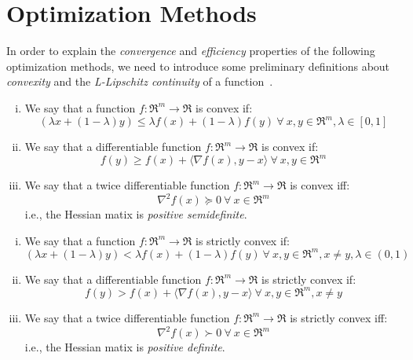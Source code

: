 
\section{Optimization Methods}

In order to explain the \emph{convergence} and \emph{efficiency} properties of the following optimization methods, we need to introduce some preliminary definitions about \emph{convexity} and the \emph{L-Lipschitz continuity} of a function~\cite{boyd2004convex}.

\begin{definition}[Convexity] \label{def:convexity}
	\hfill
	\begin{enumerate}[(i)]
		\item We say that a function $f: \Re^m \rightarrow \Re$ is convex if: 
		$$ 
			(\lambda x + (1 - \lambda) y ) \leq \lambda f(x) + (1 - \lambda) f(y) \ \forall \ x, y \in \Re^m, \lambda \in [0,1] 
		$$
		\item We say that a differentiable function $f: \Re^m \rightarrow \Re$ is convex if: 
		$$ 
			f(y) \geq f(x) + \langle \nabla f(x), y - x \rangle \ \forall \ x, y \in \Re^m 
		$$
		\item We say that a twice differentiable function $f: \Re^m \rightarrow \Re$ is convex iff: 
		$$ 
			\nabla^2 f(x) \succeq 0 \ \forall \ x \in \Re^m 
		$$ i.e., the Hessian matix is \emph{positive semidefinite}.
	\end{enumerate}
\end{definition}

\begin{definition} \label{def:strict_convexity}
	\hfill
	\begin{enumerate}[(i)]
		\item We say that a function $f: \Re^m \rightarrow \Re$ is strictly convex if: 
		$$ 
			(\lambda x + (1 - \lambda) y ) < \lambda f(x) + (1 - \lambda) f(y) \ \forall \ x, y \in \Re^m, x \neq y, \lambda \in (0,1) 
		$$
		\item We say that a differentiable function $f: \Re^m \rightarrow \Re$ is strictly convex if: 
		$$ 
			f(y) > f(x) + \langle \nabla f(x), y - x \rangle \ \forall \ x, y \in \Re^m, x \neq y
		$$
		\item We say that a twice differentiable function $f: \Re^m \rightarrow \Re$ is strictly convex iff: 
		$$ 
			\nabla^2 f(x) \succ 0 \ \forall \ x \in \Re^m 
		$$ i.e., the Hessian matix is \emph{positive definite}.
	\end{enumerate}
\end{definition}

